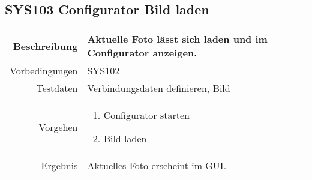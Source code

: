 \subsection{SYS103 Configurator Bild laden }
\begin{table}[h!]
	\renewcommand{\arraystretch}{1.5}
	\begin{tabular}{|r|p{14cm}|}
		\hline Beschreibung & Aktuelle Foto lässt sich laden und im Configurator anzeigen. \\ 
		\hline Vorbedingungen & SYS102 \\ 
		\hline Testdaten & Verbindungsdaten definieren, Bild \\ 
		\hline Vorgehen & 
		\begin{enumerate}
			\item Configurator starten
			\item Bild laden
		\end{enumerate} \\ 
		\hline Ergebnis & Aktuelles Foto erscheint im GUI. \\ 
		\hline 
	\end{tabular}
\end{table}